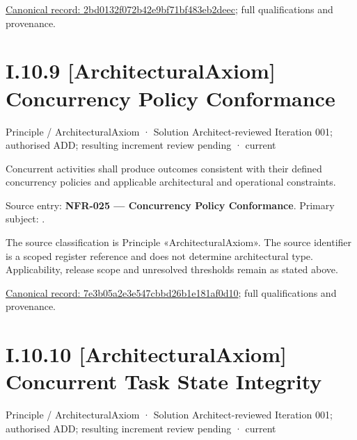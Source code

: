 {\footnotesize \href{../../../../../../../continuum/motivation/principle/architectural-axiom/2bd0132f072b42e9bf71bf483eb2deec.md}{Canonical record: 2bd0132f072b42e9bf71bf483eb2deec}; full qualifications and provenance.}\par
\section*{I.10.9 [ArchitecturalAxiom] Concurrency Policy Conformance}
\label{navigation:I.10.9}

\label{element:7e3b05a2e3e547cbbd26b1e181af0d10}
{\small Principle / ArchitecturalAxiom · Solution Architect-reviewed Iteration 001; authorised ADD; resulting increment review pending · current}\par

Concurrent activities shall produce outcomes consistent with their defined concurrency policies and applicable architectural and operational constraints.



Source entry: \textbf{NFR-025 — Concurrency Policy Conformance}. Primary subject: \texttt{}.



The source classification is Principle «ArchitecturalAxiom». The source identifier is a scoped register reference and does not determine architectural type. Applicability, release scope and unresolved thresholds remain as stated above.


{\footnotesize \href{../../../../../../../continuum/motivation/principle/architectural-axiom/7e3b05a2e3e547cbbd26b1e181af0d10.md}{Canonical record: 7e3b05a2e3e547cbbd26b1e181af0d10}; full qualifications and provenance.}\par
\section*{I.10.10 [ArchitecturalAxiom] Concurrent Task State Integrity}
\label{navigation:I.10.10}

\label{element:26f3759e1d014a7cae5f265ea6530000}
{\small Principle / ArchitecturalAxiom · Solution Architect-reviewed Iteration 001; authorised ADD; resulting increment review pending · current}\par


